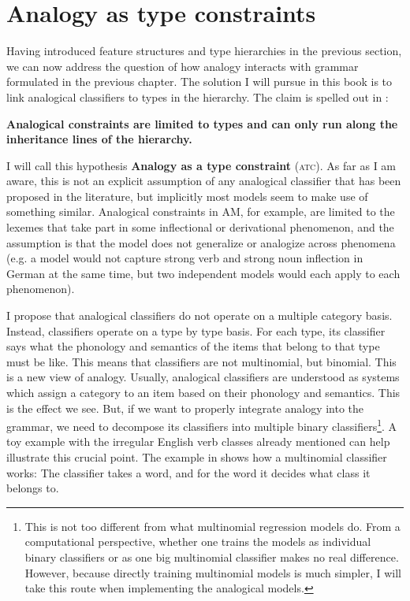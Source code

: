 
\section{Analogy as type constraints}


Having introduced feature structures and type hierarchies in the previous section, we can now address the question of how analogy interacts with grammar formulated in the previous chapter. The solution I will pursue in this book is to link analogical classifiers to types in the hierarchy. The claim is spelled out in :

\begin{exe}
    \ex \label{claim-book} \textbf{Analogical constraints are limited to types and can only run along the inheritance lines of the hierarchy.}
\end{exe}

I will call this hypothesis \textbf{Analogy as a type constraint} (\textsc{atc}). As far as I am aware, this is not an explicit assumption of any analogical classifier that has been proposed in the literature, but implicitly most models seem to make use of something similar. Analogical constraints in AM, for example, are limited to the lexemes that take part in some inflectional or derivational phenomenon, and the assumption is that the model does not generalize or analogize across phenomena (e.g. a model would not capture strong verb and strong noun inflection in German at the same time, but two independent models would each apply to each phenomenon).

I propose that analogical classifiers do not operate on a multiple category basis. Instead, classifiers operate on a type by type basis. For each type, its classifier says what the phonology and semantics of the items that belong to that type must be like. This means that classifiers are not multinomial, but binomial. This is a new view of analogy. Usually, analogical classifiers are understood as systems which assign a category to an item based on their phonology and semantics. This is the effect we see. But, if we want to properly integrate analogy into the grammar, we need to decompose its classifiers into multiple binary classifiers\footnote{This is not too different from what multinomial regression models do. From a computational perspective, whether one trains the models as individual binary classifiers or as one big multinomial classifier makes no real difference. However, because directly training multinomial models is much simpler, I will take this route when implementing the analogical models.}. A toy example with the irregular English verb classes already mentioned can help illustrate this crucial point. The example in  shows how a multinomial classifier works: The classifier takes a word, and for the word it decides what class it belongs to.

